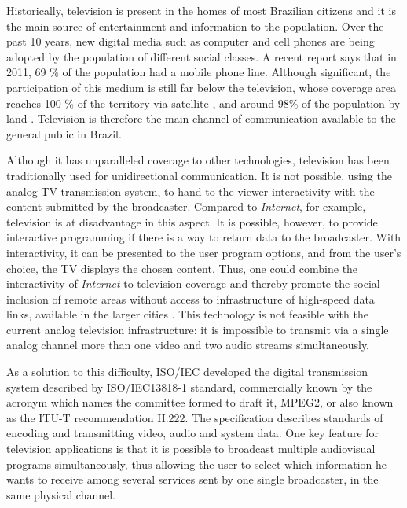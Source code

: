 \documentclass[
	12pt,				%
	openright,			%
	twoside,			%
	a4paper,			%
	brazil,
	french,				%
	english
	]{abntex2}
\begin{document}
Historically, television is present in the homes of most Brazilian citizens and it is the main source of entertainment and information to the population. Over the past 10 years, new digital media such as computer and cell phones are being adopted by the population of different social classes. A recent report \cite{pnad2011} says that in 2011, 69 \% of the population had a mobile phone line. Although significant, the participation of this medium is still far below the television, whose coverage area reaches 100 \% of the territory via satellite \cite{StarOne}, and around 98\% of the population by land \cite{globo}. Television is therefore the main channel of communication available to the general public in Brazil.

Although it has unparalleled coverage to other technologies, television has been traditionally used for unidirectional communication. It is not possible, using the analog TV transmission system, to hand to the viewer interactivity with the content submitted by the broadcaster. Compared to \textit{Internet}, for example, television is at disadvantage in this aspect. It is possible, however, to provide interactive programming if there is a way to return data to the broadcaster. With interactivity, it can be presented to the user program options, and from the user's choice, the TV displays the chosen content. Thus, one could combine the interactivity of \textit{Internet} to television coverage and thereby promote the social inclusion of remote areas without access to infrastructure of high-speed data links, available in the larger cities . This technology is not feasible with the current analog television infrastructure: it is impossible to transmit via a single analog channel more than one video and two audio streams simultaneously.

As a solution to this difficulty, ISO/IEC developed the digital transmission system described by ISO/IEC13818-1 standard, commercially known by the acronym which names the committee formed to draft it, MPEG2, or also known as the ITU-T recommendation H.222. The specification describes standards of encoding and transmitting video, audio and system data. One key feature for television applications is that it is possible to broadcast multiple audiovisual programs simultaneously, thus allowing the user to select which information he wants to receive among several services sent by one single broadcaster, in the same physical channel.
\end{document}
